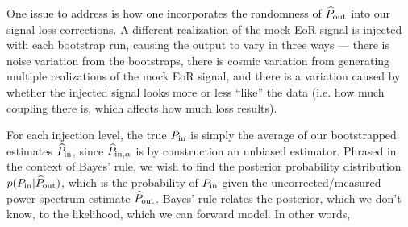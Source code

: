 \documentclass[preprint2,numberedappendix,tighten]{aastex6}  %
\newcommand{\phat}{\widehat{\mathbf{p}}}
\newcommand{\acl}[1]{{\color{red} \textbf{[ACL:  #1]}}}
\newcommand{\dcj}[1]{{\color{orange} \textbf{[DCJ: #1]}}}
\begin{document}

One issue to address is how one incorporates the randomness of $\widehat{P}_{\rm out}$ into our signal loss corrections. A different realization of the mock EoR signal is injected with each bootstrap run, causing the output to vary in three ways ---  there is noise variation from the bootstraps, there is cosmic variation from generating multiple realizations of the mock EoR signal, and there is a variation caused by whether the injected signal looks more or less ``like'' the data (i.e. how much coupling there is, which affects how much loss results). 

For each injection level, the true $P_{\rm in}$ is simply the average of our bootstrapped estimates $\widehat{P}_{\rm in}$, since $\widehat{P}_{\rm in, \alpha}$ is by construction an unbiased estimator. Phrased in the context of Bayes' rule, we wish to find the posterior probability distribution $p(P_{\rm in} | 
\widehat{P}_{\rm out})$, which is the probability of $P_{\rm in}$ given the uncorrected/measured power spectrum estimate $\widehat{P}_{\rm out}$.  Bayes' rule relates the posterior, which we don't know, to the likelihood, which we can forward model. In other words,
\end{document}
